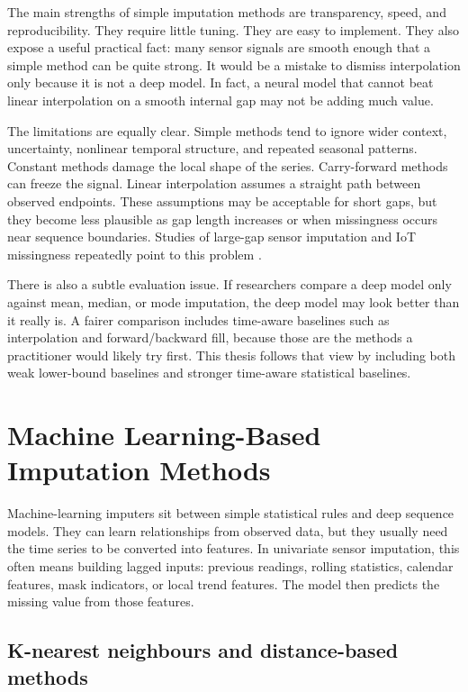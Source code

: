 The main strengths of simple imputation methods are transparency, speed, and reproducibility. They require little tuning. They are easy to implement. They also expose a useful practical fact: many sensor signals are smooth enough that a simple method can be quite strong. It would be a mistake to dismiss interpolation only because it is not a deep model. In fact, a neural model that cannot beat linear interpolation on a smooth internal gap may not be adding much value.

The limitations are equally clear. Simple methods tend to ignore wider context, uncertainty, nonlinear temporal structure, and repeated seasonal patterns. Constant methods damage the local shape of the series. Carry-forward methods can freeze the signal. Linear interpolation assumes a straight path between observed endpoints. These assumptions may be acceptable for short gaps, but they become less plausible as gap length increases or when missingness occurs near sequence boundaries. Studies of large-gap sensor imputation and IoT missingness repeatedly point to this problem \cite{Wu2022DataIF,Ahmed2022LongGM,Liu2020}.

There is also a subtle evaluation issue. If researchers compare a deep model only against mean, median, or mode imputation, the deep model may look better than it really is. A fairer comparison includes time-aware baselines such as interpolation and forward/backward fill, because those are the methods a practitioner would likely try first. This thesis follows that view by including both weak lower-bound baselines and stronger time-aware statistical baselines.

\section{Machine Learning-Based Imputation Methods}

Machine-learning imputers sit between simple statistical rules and deep sequence models. They can learn relationships from observed data, but they usually need the time series to be converted into features. In univariate sensor imputation, this often means building lagged inputs: previous readings, rolling statistics, calendar features, mask indicators, or local trend features. The model then predicts the missing value from those features.

\subsection{K-nearest neighbours and distance-based methods}


